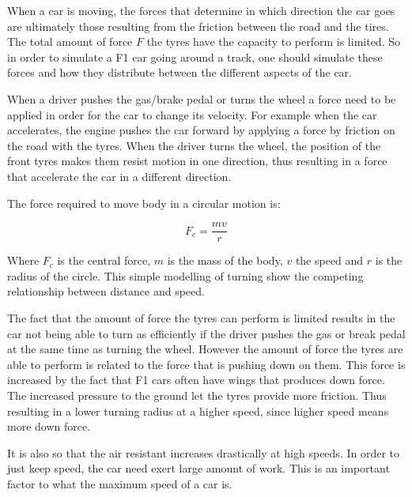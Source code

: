 When a car is moving, the forces that determine in which direction the car goes are ultimately those resulting from the friction between the road and the tires. The total amount of force $F$ the tyres have the capacity to perform is limited. So in order to simulate a F1 car going around a track, one should simulate these forces and how they distribute between the different aspects of the car.

When a driver pushes the gas/brake pedal or turns the wheel a force need to be applied in order for the car to change its velocity. For example when the car accelerates, the engine pushes the car forward by applying a force by friction on the road with the tyres. When the driver turns the wheel, the position of the front tyres makes them resist motion in one direction, thus resulting in a force that accelerate the car in a different direction.

The force required to move body in a circular motion is:

\[
F_c = \frac{mv}{r}
\]

Where $F_c$ is the central force, $m$ is the mass of the body, $v$ the speed and $r$ is the radius of the circle. This simple modelling of turning show the competing relationship between distance and speed.

The fact that the amount of force the tyres can perform is limited results in the car not being able to turn as efficiently if the driver pushes the gas or break pedal at the same time as turning the wheel. However the amount of force the tyres are able to perform is related to the force that is pushing down on them. This force is increased by the fact that F1 cars often have wings that produces down force. The increased pressure to the ground let the tyres provide more friction. Thus resulting in a lower turning radius at a higher speed, since higher speed means more down force.


It is also so that the air resistant increases drastically at high speeds. In order to just keep speed, the car need exert large amount of work. This is an important factor to what the maximum speed of a car is.

